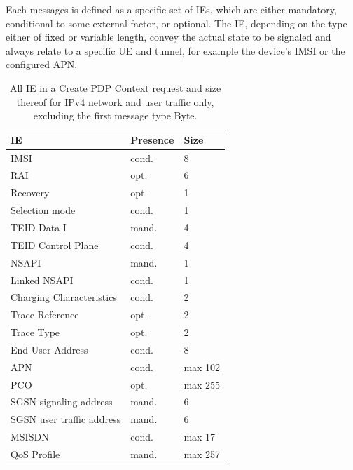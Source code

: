 Each messages is defined as a specific set of \glspl{IE}, which are either mandatory, conditional to some external factor, or optional. The \gls{IE}, depending on the type either of fixed or variable length, convey the actual state to be signaled and always relate to a specific \gls{UE} and tunnel, for example the device's \gls{IMSI} or the configured \gls{APN}.

\begin{table}[htbp]
\caption{All \gls{IE} in a Create \gls{PDP} Context request and size thereof for \gls{IPv4} network and user traffic only, excluding the first message type Byte.}
\label{c4:tab:createrequestelements}
	\begin{tabu} to 0.49\textwidth{X[2.5]X[1.2]X[0.7]}
		\toprule
		\textbf{\gls{IE}} & \textbf{Presence} & \textbf{Size}\\
		\midrule
		\gls{IMSI} & cond. & \SI{8}{\byte} \\ 
		\acrshort{RAI} & opt. & \SI{6}{\byte} \\
		Recovery & opt. & \SI{1}{\byte} \\
		Selection mode	& cond. & \SI{1}{\byte} \\
		\gls{TEID} Data I & mand. & \SI{4}{\byte} \\
		\gls{TEID} Control Plane & cond. & \SI{4}{\byte} \\
		\gls{NSAPI} & mand. & \SI{1}{\byte} \\
		Linked \gls{NSAPI} & cond. & \SI{1}{\byte} \\
		Charging Characteristics & cond. & \SI{2}{\byte} \\
		Trace Reference & opt. & \SI{2}{\byte} \\
		Trace Type & opt. & \SI{2}{\byte} \\
		End User Address & cond. & \SI{8}{\byte} \\
		\gls{APN} & cond. & max \SI{102}{\byte} \\ %
		\acrshort{PCO} & opt. & max \SI{255}{\byte} \\ %
		\gls{SGSN} signaling address & mand.  & \SI{6}{\byte} \\ %
		\gls{SGSN} user traffic address & mand. & \SI{6}{\byte} \\ %
		\gls{MSISDN} & cond. & max \SI{17}{\byte} \\ %
		\gls{QoS} Profile & mand. & max \SI{257}{\byte} \\

\end{tabu}
\end{table}
